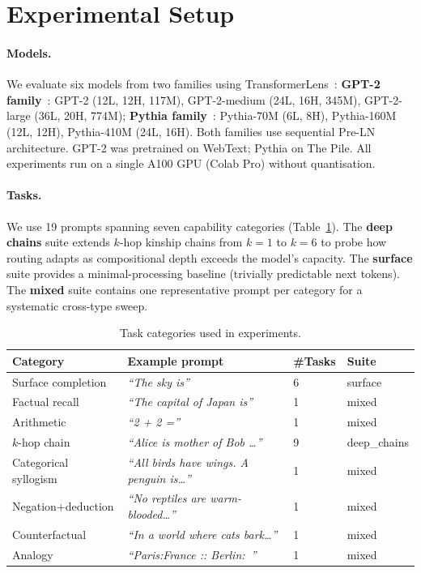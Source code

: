 \documentclass{article}
\begin{document}
\section{Experimental Setup}

\paragraph{Models.}
We evaluate six models from two families using TransformerLens~\citep{nanda2022transformerlens}:
\textbf{GPT-2 family}~\citep{radford2019language}:
GPT-2 (12L, 12H, 117M), GPT-2-medium (24L, 16H, 345M),
GPT-2-large (36L, 20H, 774M);
\textbf{Pythia family}~\citep{biderman2023pythia}:
Pythia-70M (6L, 8H), Pythia-160M (12L, 12H), Pythia-410M (24L, 16H).
Both families use sequential Pre-LN architecture.
GPT-2 was pretrained on WebText; Pythia on The Pile.
All experiments run on a single A100 GPU (Colab Pro) without
quantisation.

\paragraph{Tasks.}
We use 19 prompts spanning seven capability categories
(Table~\ref{tab:tasks}).
The \textbf{deep chains} suite extends $k$-hop kinship chains from
$k=1$ to $k=6$ to probe how routing adapts as compositional depth
exceeds the model's capacity.
The \textbf{surface} suite provides a minimal-processing baseline
(trivially predictable next tokens).
The \textbf{mixed} suite contains one representative prompt per category
for a systematic cross-type sweep.

\begin{table}[h]
\centering
\caption{Task categories used in experiments.}
\label{tab:tasks}
\small
\begin{tabular}{llll}
\toprule
Category & Example prompt & \#Tasks & Suite \\
\midrule
Surface completion   & \textit{``The sky is''}                          & 6 & surface \\
Factual recall       & \textit{``The capital of Japan is''}             & 1 & mixed \\
Arithmetic           & \textit{``2 + 2 =''}                             & 1 & mixed \\
$k$-hop chain        & \textit{``Alice is mother of Bob \ldots''}       & 9 & deep\_chains \\
Categorical syllogism & \textit{``All birds have wings. A penguin is\ldots''}  & 1 & mixed \\
Negation+deduction   & \textit{``No reptiles are warm-blooded\ldots''}   & 1 & mixed \\
Counterfactual       & \textit{``In a world where cats bark\ldots''}     & 1 & mixed \\
Analogy              & \textit{``Paris:France :: Berlin:~''}             & 1 & mixed \\
\bottomrule
\end{tabular}
\end{table}
\end{document}
